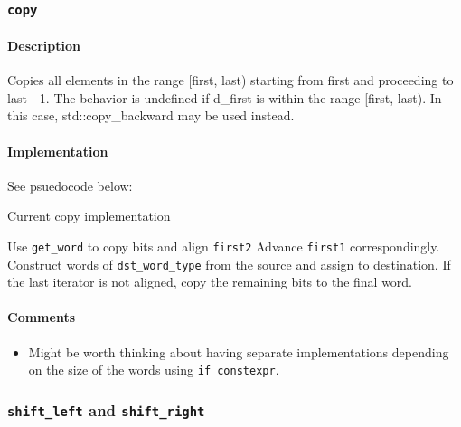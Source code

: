 \documentclass[letterpaper, 8pt, twocolumn]{article}
\begin{document}
\subsubsection{\texttt{copy}}
\label{subsubsec:copy}
\paragraph{Description}
Copies all elements in the range [first, last) starting from first and 
proceeding to last - 1. The behavior is undefined if d\_first is within the 
range [first, last). In this case, std::copy\_backward may be used instead.

\paragraph{Implementation}
See psuedocode below:
\begin{algorithm}[H]
    \caption{Current copy implementation}
    \begin{algorithmic}[1]
            \State Use \texttt{get\_word} to copy bits and align \texttt{first2}
            \State Advance \texttt{first1} correspondingly.
        \EndIf
            \State Construct words of \texttt{dst\_word\_type}
            from the source and assign to destination.
        \EndWhile
        \State If the last iterator is not aligned, copy the remaining bits to the
            final word.
        \EndFunction
    \end{algorithmic}
\end{algorithm}
\paragraph{Comments}
\begin{itemize}
    \item Might be worth thinking about having separate implementations 
        depending on the size of the words using \texttt{if constexpr}.
\end{itemize}

\subsubsection{\texttt{shift\_left} and \texttt{shift\_right}}
\label{subsubsec:shift}
\end{document}
